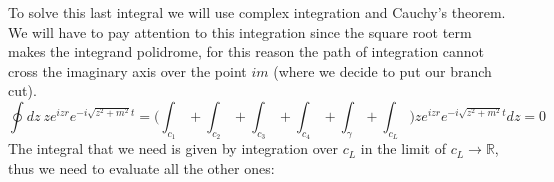 To solve this last integral we will use complex integration and Cauchy's theorem.\\
We will have to pay attention to this integration since the square root term makes the integrand polidrome, for this reason the path of integration cannot cross the imaginary axis over the point $im$ (where we decide to put our branch cut).
\begin{equation*}
    \oint dz\ ze^{izr}e^{-i\sqrt{z^2+m^2}t}=\biggl(\int_{c_1}+\int_{c_2}+\int_{c_3}+\int_{c_4}+\int_{\gamma}+\int_{c_L}\biggr)ze^{izr}e^{-i\sqrt{z^2+m^2}t}dz=0
\end{equation*}
The integral that we need is given by integration over $c_L$ in the limit of $c_L\rightarrow\mathbb{R}$, thus we need to evaluate all the other ones:
